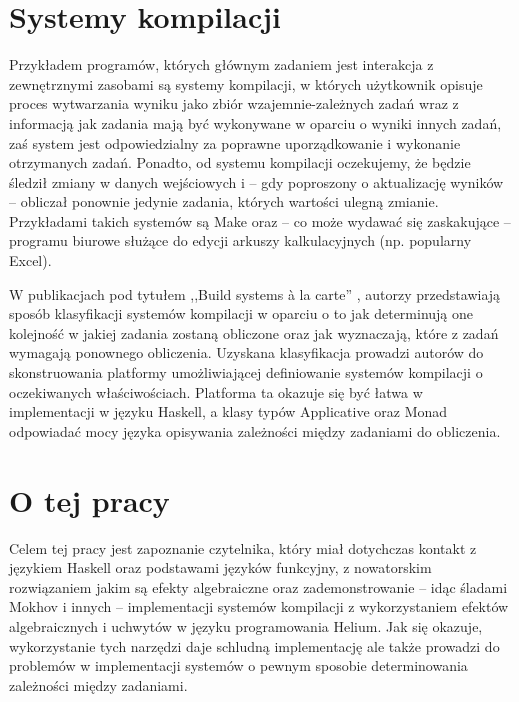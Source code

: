 \documentclass[shortabstract]{iithesis}
\begin{document}
\section{Systemy kompilacji}

Przykładem programów, których głównym zadaniem jest interakcja z zewnętrznymi zasobami są systemy kompilacji, w których użytkownik opisuje proces wytwarzania wyniku jako zbiór wzajemnie-zależnych zadań wraz z informacją jak zadania mają być wykonywane w oparciu o wyniki innych zadań, zaś system jest odpowiedzialny za poprawne uporządkowanie i wykonanie otrzymanych zadań. Ponadto, od systemu kompilacji oczekujemy, że będzie śledził zmiany w danych wejściowych i -- gdy poproszony o aktualizację wyników -- obliczał ponownie jedynie zadania, których wartości ulegną zmianie. Przykładami takich systemów są Make oraz -- co może wydawać się zaskakujące -- programu biurowe służące do edycji arkuszy kalkulacyjnych (np. popularny Excel).


W publikacjach pod tytułem ,,Build systems {\`a} la carte'' \cite{mokhov2018build, mokhov2020build}, autorzy przedstawiają sposób klasyfikacji systemów kompilacji w oparciu o to jak determinują one kolejność w jakiej zadania zostaną obliczone oraz jak wyznaczają, które z zadań wymagają ponownego obliczenia. Uzyskana klasyfikacja prowadzi autorów do skonstruowania platformy umożliwiającej definiowanie systemów kompilacji o oczekiwanych właściwościach. Platforma ta okazuje się być łatwa w implementacji w języku Haskell, a klasy typów Applicative oraz Monad odpowiadać mocy języka opisywania zależności między zadaniami do obliczenia.

\section{O tej pracy}

Celem tej pracy jest zapoznanie czytelnika, który miał dotychczas kontakt z językiem Haskell oraz podstawami języków funkcyjny, z nowatorskim rozwiązaniem jakim są efekty algebraiczne oraz zademonstrowanie -- idąc śladami Mokhov i innych \cite{mokhov2018build} -- implementacji systemów kompilacji z wykorzystaniem efektów algebraicznych i uchwytów w języku programowania Helium. Jak się okazuje, wykorzystanie tych narzędzi daje schludną implementację ale także prowadzi do problemów w implementacji systemów o pewnym sposobie determinowania zależności między zadaniami.
\end{document}
